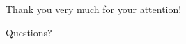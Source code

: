 \documentclass[xcolor=x11names, aspectratio=169,usenames,dvipsnames]{beamer}
\begin{document}
\begin{frame}
\vfill\vfill\vfill
\begin{center}\Large
Thank you very much for your attention!\\\bigskip

Questions?
\end{center}\vfill\vfill
\end{frame}

\maketitle
\end{document}
